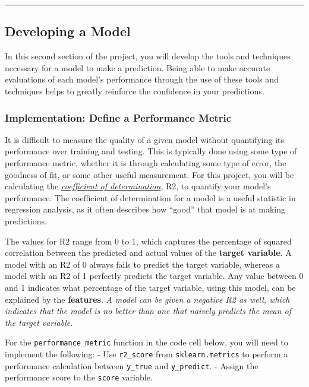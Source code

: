 \documentclass{article}
\begin{document}
    \begin{center}\rule{0.5\linewidth}{\linethickness}\end{center}

\subsection{Developing a Model}\label{developing-a-model}

In this second section of the project, you will develop the tools and
techniques necessary for a model to make a prediction. Being able to
make accurate evaluations of each model's performance through the use of
these tools and techniques helps to greatly reinforce the confidence in
your predictions.

    \subsubsection{Implementation: Define a Performance
Metric}\label{implementation-define-a-performance-metric}

It is difficult to measure the quality of a given model without
quantifying its performance over training and testing. This is typically
done using some type of performance metric, whether it is through
calculating some type of error, the goodness of fit, or some other
useful measurement. For this project, you will be calculating the
\href{http://stattrek.com/statistics/dictionary.aspx?definition=coefficient_of_determination}{\emph{coefficient
of determination}}, R2, to quantify your model's performance. The
coefficient of determination for a model is a useful statistic in
regression analysis, as it often describes how ``good'' that model is at
making predictions.

The values for R2 range from 0 to 1, which captures the percentage of
squared correlation between the predicted and actual values of the
\textbf{target variable}. A model with an R2 of 0 always fails to
predict the target variable, whereas a model with an R2 of 1 perfectly
predicts the target variable. Any value between 0 and 1 indicates what
percentage of the target variable, using this model, can be explained by
the \textbf{features}. \emph{A model can be given a negative R2 as well,
which indicates that the model is no better than one that naively
predicts the mean of the target variable.}

For the \texttt{performance\_metric} function in the code cell below,
you will need to implement the following: - Use \texttt{r2\_score} from
\texttt{sklearn.metrics} to perform a performance calculation between
\texttt{y\_true} and \texttt{y\_predict}. - Assign the performance score
to the \texttt{score} variable.
\end{document}
